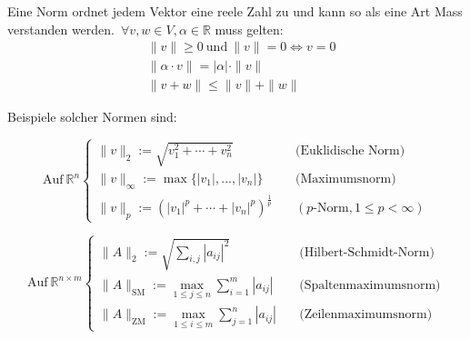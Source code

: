 \begin{tcolorbox}[colback=gray!30, colframe=gray!80, title=Vektornormen]
    Eine Norm ordnet jedem Vektor eine reele Zahl zu und kann so als eine Art Mass verstanden werden.\ \( \forall v, w \in V, \alpha \in \mathbb{R} \) muss gelten:
    \begin{equation*}
        \begin{aligned}
            & \| v \| \geq 0 \ \text{und} \ \| v \| = 0 \Leftrightarrow v = 0 \\[0.5em]
            & \| \alpha \cdot v \| = |\alpha| \cdot \| v \| \\[0.5em]
            & \| v + w \| \leq \| v \| + \| w \|
        \end{aligned}
    \end{equation*}
\end{tcolorbox}

\vspace{0.5\baselineskip}

Beispiele solcher Normen sind:

\begin{equation*}
    \text{Auf} \ \mathbb{R}^n \left\{ 
    \begin{array}{ll}  
        \| v \|_2 := \sqrt{v_1^2 + \cdots + v_n^2} \quad &\text{(Euklidische Norm)}\\[0.75em]
        \| v \|_\infty := \max \{ |v_1|, \ldots, |v_n| \} \quad &\text{(Maximumsnorm)}\\[0.75em]
        \| v \|_p := \left( |v_1|^p + \cdots + |v_n|^p \right)^{\frac{1}{p}} \quad &(p\text{-Norm}, 1\leq p < \infty)
    \end{array}
\right. 
\end{equation*}

\vspace{0.5\baselineskip}

\begin{equation*}
    \text{Auf} \ \mathbb{R}^{n \times m} \left\{ 
    \begin{array}{ll}  
        \| A \|_2 := \sqrt{\sum_{i,j}|a_{ij}|^2} \quad &\text{(Hilbert-Schmidt-Norm)}\\[0.75em]
        \| A \|_{\text{SM}} := \underset{1 \leq j \leq n}{\max} \sum_{i=1}^{m} | a_{ij} | \quad &\text{(Spaltenmaximumsnorm)}\\[0.75em]
        \| A \|_{\text{ZM}} := \underset{1 \leq i \leq m}{\max} \sum_{j=1}^{n} | a_{ij} | \quad &\text{(Zeilenmaximumsnorm)}
    \end{array}
\right. 
\end{equation*}

